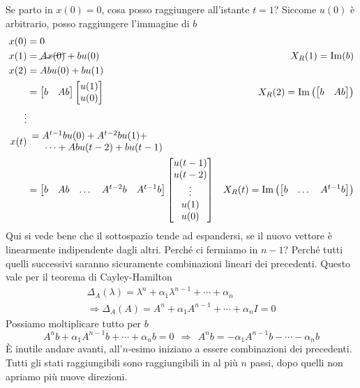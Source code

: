 \documentclass[10pt,a4paper]{book}
\begin{document}
Se parto in $x( 0) =0$, cosa posso raggiungere all'istante $t=1$? Siccome $u( 0)$ è arbitrario, posso raggiungere l'immagine di $b$
\begin{equation*}
\begin{aligned}
x( 0) & =0 & \\
x( 1) & =\cancel{Ax( 0)} +bu( 0) & X_{R}( 1) =\mathrm{Im}( b)\\
x( 2) & =Abu( 0) +bu( 1) & \\
 & =\begin{bmatrix}
b & Ab
\end{bmatrix}\begin{bmatrix}
u( 1)\\
u( 0)
\end{bmatrix} & X_{R}( 2) =\mathrm{Im}\left(\begin{bmatrix}
b & Ab
\end{bmatrix}\right)\\
\vdots  &  & \\
x( t) &  \begin{array}{l}
=A^{t-1} bu( 0) +A^{t-2} bu( 1) +\\
\ \ \ \ \cdots +Abu( t-2) +bu( t-1)
\end{array} & \\
 & =\begin{bmatrix}
b & Ab & \dotsc  & A^{t-2} b & A^{t-1} b
\end{bmatrix}\begin{bmatrix}
u( t-1)\\
u( t-2)\\
\vdots \\
u( 1)\\
u( 0)
\end{bmatrix} & X_{R}( t) =\mathrm{Im}\left(\begin{bmatrix}
b & \dotsc  & A^{t-1} b
\end{bmatrix}\right)
\end{aligned}
\end{equation*}
Qui si vede bene che il sottospazio tende ad espandersi, se il nuovo vettore è linearmente indipendente dagli altri. Perché ci fermiamo in $n-1$? Perché tutti quelli successivi saranno sicuramente combinazioni lineari dei precedenti. Questo vale per il teorema di Cayley-Hamilton
\begin{gather*}
\Delta _{A}( \lambda ) =\lambda ^{n} +\alpha _{1} \lambda ^{n-1} +\cdots +\alpha _{n}\\
\Rightarrow \Delta _{A}( A) =A^{n} +\alpha _{1} A^{n-1} +\cdots +\alpha _{n} I=0
\end{gather*}
Possiamo moltiplicare tutto per $b$
\begin{equation*}
A^{n} b+\alpha _{1} A^{n-1} b+\cdots +\alpha _{n} b=0\ \ \Rightarrow \ \ A^{n} b=-\alpha _{1} A^{n-1} b-\cdots -\alpha _{n} b
\end{equation*}
È inutile andare avanti, all'$n$-esimo iniziano a essere combinazioni dei precedenti. Tutti gli stati raggiungibili sono raggiungibili in al più $n$ passi, dopo quelli non apriamo più nuove direzioni.
\end{document}
